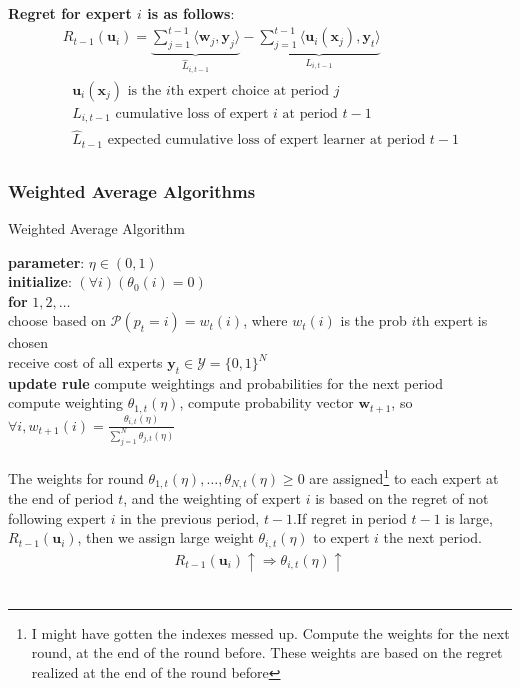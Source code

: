\documentclass[11pt]{article}
\newcommand\tab[1][1cm]{\hspace*{#1}}
\theoremstyle{quest}
\begin{document}
\begin{tcolorbox}
\textbf{Regret for expert $i$ is as follows}:
\begin{align*}
&R_{t-1}(\mathbf{u}_i) = \underbrace{\sum_{j=1}^{t-1}\langle \mathbf{w}_j, \mathbf{y}_j \rangle}_{\hat{L}_{i,t-1}}
-  \underbrace{\sum_{j=1}^{t-1} \langle \mathbf{u}_i(\mathbf{x}_j), \mathbf{y}_t \rangle}_{L_{i,t-1}} \\
 &\text{     $\mathbf{u}_i(\mathbf{x}_j)$ is the $i$th expert choice at period $j$} \\ 
 &\text{ $L_{i,t-1}$ cumulative loss of expert $i$ at period $t-1$ }\\
  &\text{ $\hat{L}_{t-1}$ expected cumulative loss of expert learner at period $t-1$ }\\
 \end{align*} 
\end{tcolorbox}
\newpage
\subsubsection{ Weighted Average Algorithms}
\begin{tcolorbox}
\begin{center} Weighted Average Algorithm\end{center}
\textbf{parameter}: $\eta\in(0,1) $\\
\textbf{initialize}: $(\forall i)(\theta_0(i)=0)$\\
\textbf{for} $1, 2, \dots$\\
\tab choose  based on $\mathcal{P}(p_t =i)=w_{t}(i)$, where $w_{t}(i)$ is the prob $i$th expert is chosen  \\
\tab receive cost of all experts $\mathbf{y}_t\in \mathcal{Y}=\{0,1\}^N$\\
\tab \textbf{update rule} compute weightings and probabilities for the next period\\
\tab \tab compute weighting $\theta_{1,t}(\eta)$, compute probability vector  $\mathbf{w}_{t+1}$, so $\forall i, w_{t+1}(i)=\frac{\theta_{i,t}(\eta)}{\sum_{j=1}^N \theta_{j,t}(\eta)}$\\ \\ 

The weights for round $\theta_{1,t}(\eta),\dots,\theta_{N,t}(\eta)\ge0$ are assigned\footnote{I might have gotten the indexes messed up. Compute the weights for the next round, at the end of the round before. These weights are based on the regret realized at the end of the round before} to each expert at the end of period $t$, and the weighting of expert $i$ is based on the regret of not following expert $i$ in the previous period, $t-1$.If regret in period $t-1$ is large, $R_{t-1}(\mathbf{u}_i)$, then we assign large weight $\theta_{i,t}(\eta)$ to expert $i$ the next period.  
 \begin{align*} R_{t-1}(\mathbf{u}_i) \uparrow \Rightarrow \theta_{i,t}(\eta) \uparrow\end{align*}\\ 
\end{tcolorbox}
\end{document}

